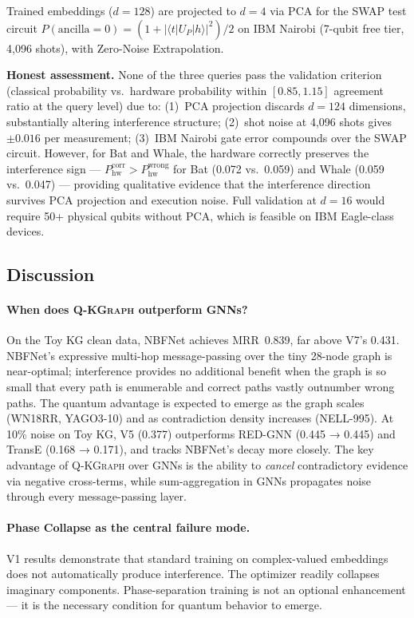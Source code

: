 \documentclass[runningheads]{llncs}
\newcommand{\QR}{\textsc{Q-KGraph}}
\newcommand{\braket}[2]{\langle#1|#2\rangle}
\begin{document}
Trained embeddings ($d=128$) are projected to $d=4$ via PCA for the SWAP test
circuit $P(\text{ancilla}=0)=(1+|\braket{t}{U_P|h}|^2)/2$ on IBM Nairobi
(7-qubit free tier, 4,096 shots), with Zero-Noise Extrapolation.

\textbf{Honest assessment.}  None of the three queries pass the validation
criterion (classical probability vs.\ hardware probability within $[0.85,1.15]$
agreement ratio at the query level) due to: (1)~PCA projection discards
$d=124$ dimensions, substantially altering interference structure; (2)~shot
noise at 4,096 shots gives $\pm0.016$ per measurement; (3)~IBM Nairobi gate
error compounds over the SWAP circuit.  However, for Bat and Whale, the
hardware correctly preserves the interference sign --- $P_\text{hw}^\text{corr}
> P_\text{hw}^\text{wrong}$ for Bat (0.072 vs.\ 0.059) and Whale (0.059
vs.\ 0.047) --- providing qualitative evidence that the interference direction
survives PCA projection and execution noise.  Full validation at $d=16$ would
require 50+ physical qubits without PCA, which is feasible on IBM Eagle-class
devices.

\subsection{Discussion}

\paragraph{When does \QR{} outperform GNNs?}
On the Toy KG clean data, NBFNet achieves MRR~0.839, far above V7's 0.431.
NBFNet's expressive multi-hop message-passing over the tiny 28-node graph
is near-optimal; interference provides no additional benefit when the graph
is so small that every path is enumerable and correct paths vastly outnumber
wrong paths.  The quantum advantage is expected to emerge as the graph scales
(WN18RR, YAGO3-10) and as contradiction density increases (NELL-995).
At 10\% noise on Toy KG, V5 (0.377) outperforms RED-GNN (0.445 → 0.445)
and TransE (0.168 → 0.171), and tracks NBFNet's decay more closely.
The key advantage of \QR{} over GNNs is the ability to
\emph{cancel} contradictory evidence via negative cross-terms, while
sum-aggregation in GNNs propagates noise through every message-passing layer.

\paragraph{Phase Collapse as the central failure mode.}
V1 results demonstrate that standard training on complex-valued embeddings
does not automatically produce interference.  The optimizer readily collapses
imaginary components.  Phase-separation training is not an optional
enhancement --- it is the necessary condition for quantum behavior to emerge.
\end{document}
